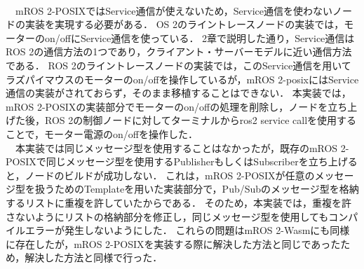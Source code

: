 \\　mROS 2-POSIXではService通信が使えないため，Service通信を使わないノードの実装を実現する必要がある．
OS 2のライントレースノードの実装では，モーターのon/offにService通信を使っている．
2章で説明した通り，Service通信はROS 2の通信方法の1つであり，クライアント・サーバーモデルに近い通信方法である．
ROS 2のライントレースノードの実装では，このService通信を用いてラズパイマウスのモーターのon/offを操作しているが，mROS 2-posixにはService通信の実装がされておらず，そのまま移植することはできない．
本実装では，mROS 2-POSIXの実装部分でモーターのon/offの処理を削除し，ノードを立ち上げた後，ROS 2の制御ノードに対してターミナルからros2 service callを使用することで，モーター電源のon/offを操作した．
\\　本実装では同じメッセージ型を使用することはなかったが，既存のmROS 2-POSIXで同じメッセージ型を使用するPublisherもしくはSubscriberを立ち上げると，ノードのビルドが成功しない．
これは，mROS 2-POSIXが任意のメッセージ型を扱うためのTemplateを用いた実装部分で，Pub/Subのメッセージ型を格納するリストに重複を許していたからである．
そのため，本実装では，重複を許さないようにリストの格納部分を修正し，同じメッセージ型を使用してもコンパイルエラーが発生しないようにした．
これらの問題はmROS 2-Wasmにも同様に存在したが，mROS 2-POSIXを実装する際に解決した方法と同じであったため，解決した方法と同様で行った．


